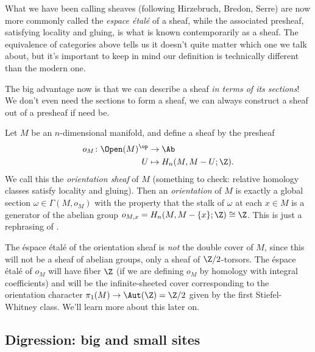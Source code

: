 \documentclass[11pt]{amsart}
\begin{document}
\begin{remark}[Important] What we have been calling sheaves (following Hirzebruch, Bredon, Serre) are now more commonly called the \emph{espace \'etal\'e} of a sheaf, while the associated presheaf, satisfying locality and gluing, is what is known contemporarily as a sheaf. The equivalence of categories above tells us it doesn't quite matter which one we talk about, but it's important to keep in mind our definition is technically different than the modern one.
\end{remark}


\begin{remark} The big advantage now is that we can describe a sheaf \emph{in terms of its sections}! We don't even need the sections to form a sheaf, we can always construct a sheaf out of a presheaf if need be.
\end{remark}

\begin{example} Let $M$ be an $n$-dimensional manifold, and define a sheaf by the presheaf
\begin{align*}
    o_M \colon \Open(M)^\op &\to \Ab \\
    U &\mapsto H_n(M,M-U;\Z).
\end{align*}
We call this the \emph{orientation sheaf} of $M$ (something to check: relative homology classes satisfy locality and gluing). Then an \emph{orientation} of $M$ is exactly a global section $\omega \in \Gamma(M,o_M)$ with the property that the stalk of $\omega$ at each $x\in M$ is a generator of the abelian group $o_{M,x} = H_n(M,M-\{x\};\Z)\cong \Z$. This is just a rephrasing of \cite[pp.~233--236]{Hatcher}.
\end{example}

\begin{remark} The \'espace \'etal\'e of the orientation sheaf is \emph{not} the double cover of $M$, since this will not be a sheaf of abelian groups, only a sheaf of $\Z/2$-torsors. The \'espace \'etal\'e of $o_M$ will have fiber $\Z$ (if we are defining $o_M$ by homology with integral coefficients) and will be the infinite-sheeted cover corresponding to the orientation character $\pi_1(M) \to \Aut(\Z) = \Z/2$ given by the first Stiefel-Whitney class. We'll learn more about this later on.
\end{remark}

\subsection{Digression: big and small sites}
\end{document}
